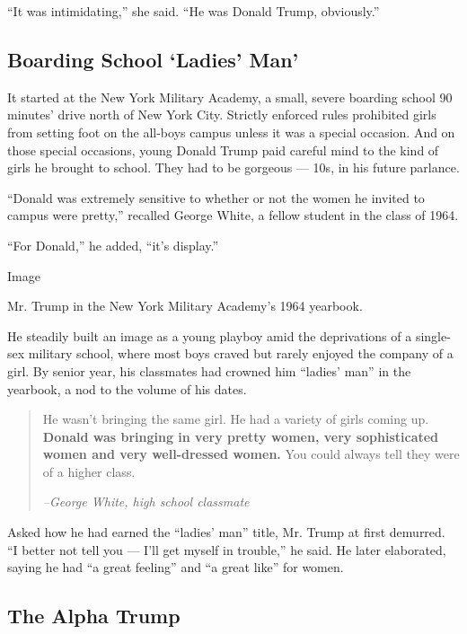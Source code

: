 ``It was intimidating,'' she said. ``He was Donald Trump, obviously.''

\hypertarget{boarding-school-ladies-man}{%
\subsection{Boarding School `Ladies'
Man'}\label{boarding-school-ladies-man}}

It started at the New York Military Academy, a small, severe boarding
school 90 minutes' drive north of New York City. Strictly enforced rules
prohibited girls from setting foot on the all-boys campus unless it was
a special occasion. And on those special occasions, young Donald Trump
paid careful mind to the kind of girls he brought to school. They had to
be gorgeous --- 10s, in his future parlance.

``Donald was extremely sensitive to whether or not the women he invited
to campus were pretty,'' recalled George White, a fellow student in the
class of 1964.

``For Donald,'' he added, ``it's display.''

Image

Mr. Trump in the New York Military Academy's 1964 yearbook.

He steadily built an image as a young playboy amid the deprivations of a
single-sex military school, where most boys craved but rarely enjoyed
the company of a girl. By senior year, his classmates had crowned him
``ladies' man'' in the yearbook, a nod to the volume of his dates.

\begin{quote}
He wasn't bringing the same girl. He had a variety of girls coming up.
\textbf{Donald was bringing in very pretty women, very sophisticated
women and very well-dressed women.} You could always tell they were of a
higher class.

\emph{--George White, high school classmate}
\end{quote}

Asked how he had earned the ``ladies' man'' title, Mr. Trump at first
demurred. ``I better not tell you --- I'll get myself in trouble,'' he
said. He later elaborated, saying he had ``a great feeling'' and ``a
great like'' for women.

\hypertarget{the-alpha-trump}{%
\subsection{The Alpha Trump}\label{the-alpha-trump}}

